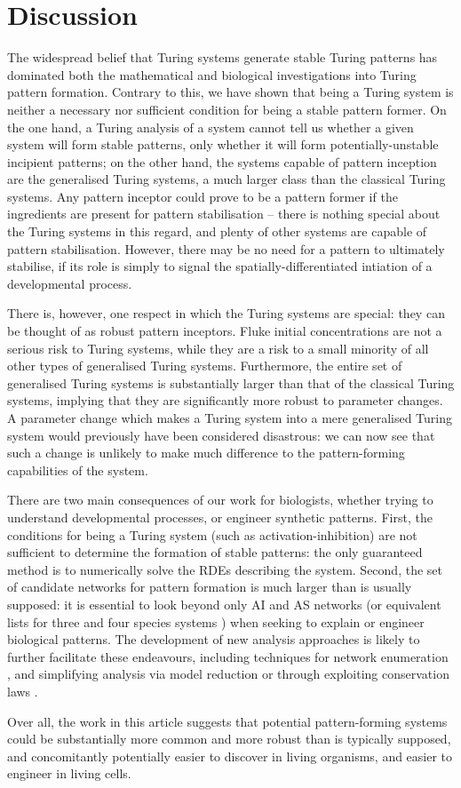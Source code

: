 \section*{Discussion}

The widespread belief that Turing systems generate stable Turing patterns has dominated both the mathematical and biological investigations into Turing pattern formation. Contrary to this, we have shown that being a Turing system is neither a necessary nor sufficient condition for being a stable pattern former. On the one hand, a Turing analysis of a system cannot tell us whether a given system will form stable patterns, only whether it will form potentially-unstable incipient patterns; on the other hand, the systems capable of pattern inception are the generalised Turing systems, a much larger class than the classical Turing systems. Any pattern inceptor could prove to be a pattern former if the ingredients are present for pattern stabilisation -- there is nothing special about the Turing systems in this regard, and plenty of other systems are capable of pattern stabilisation. However, there may be no need for a pattern to ultimately stabilise, if its role is simply to signal the spatially-differentiated intiation of a developmental process. 

There is, however, one respect in which the Turing systems are special: they can be thought of as robust pattern inceptors. Fluke initial concentrations are not a serious risk to Turing systems, while they are a risk to a small minority of all other types of generalised Turing systems. Furthermore, the entire set of generalised Turing systems is substantially larger than that of the classical Turing systems, implying that they are significantly more robust to parameter changes. A parameter change which makes a Turing system into a mere generalised Turing system would previously have been considered disastrous: we can now see that such a change is unlikely to make much difference to the pattern-forming capabilities of the system.

There are two main consequences of our work for biologists, whether trying to understand developmental processes, or engineer synthetic patterns. First, the conditions for being a Turing system (such as activation-inhibition) are not sufficient to determine the formation of stable patterns: the only guaranteed method is to numerically solve the RDEs describing the system. Second, the set of candidate networks for pattern formation is much larger than is usually supposed: it is essential to look beyond only AI and AS networks (or equivalent lists for three and four species systems \cite{marcon2016high}) when seeking to explain or engineer biological patterns. The development of new analysis approaches is likely to further facilitate these endeavours, including techniques for network enumeration \cite{marcon2016high}, and simplifying analysis via model reduction \cite{smith2018model} or through exploiting conservation laws \cite{halatek2018rethinking}.

Over all, the work in this article suggests that potential pattern-forming systems could be substantially more common and more robust than is typically supposed, and concomitantly potentially easier to discover in living organisms, and easier to engineer in living cells.